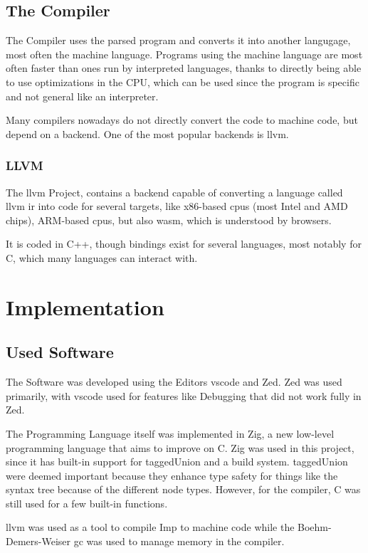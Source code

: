 \documentclass[12pt]{article}
\begin{document}
\subsection{The Compiler}
The Compiler uses the parsed program and converts it into another langugage,
most often the machine language. Programs using the machine language are most often
faster than ones run by interpreted languages, thanks to directly being able to use
optimizations in the CPU, which can be used since the program is specific
and not general like an interpreter.

Many compilers nowadays do not directly convert the code to machine code,
but depend on a backend. One of the most popular backends is \Gls{llvm}.

\subsubsection{LLVM}
The \Gls{llvm} Project, contains a backend capable of converting a language called
\Gls{llvm} \Gls{ir} into code for several targets,
like x86-based cpus (most Intel and AMD chips), ARM-based cpus, but also
\Gls{wasm}, which is understood by browsers.

It is coded in C++, though bindings exist for several languages, most notably
for C, which many languages can interact with.

\section{Implementation}

\subsection{Used Software}

The Software was developed using the Editors \Gls{vscode} and Zed.
Zed was used primarily, with \Gls{vscode} used for features like Debugging
that did not work fully in Zed.

The Programming Language itself was implemented in Zig, a new low-level programming
language that aims to improve on C. Zig was used in this project, since it has built-in
support for \gls{taggedUnion} and a build system. \Gls{taggedUnion} were deemed important because they
enhance type safety for things like the syntax tree because of the different node types.
However, for the compiler, C was still used for
a few built-in functions.

\Gls{llvm} was used as a tool to compile Imp to machine code while the
Boehm-Demers-Weiser \Gls{gc} \autocite{GarbageCollector} was
used to manage memory in the compiler.
\end{document}
